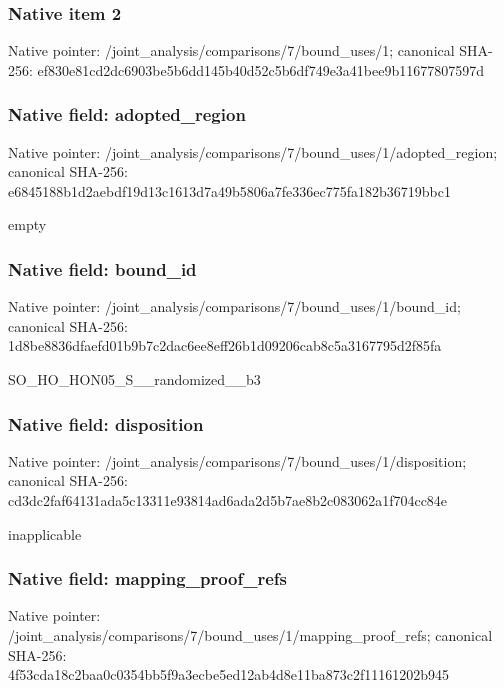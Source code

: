 \documentclass[10pt,a4paper]{article}
\begin{document}
\subsubsection{Native item 2}
Native pointer: /joint\_\allowbreak{}analysis/comparisons/7/bound\_\allowbreak{}uses/1; canonical SHA-256: ef830e81cd2dc6903be5b6dd145b40d52c5b6df749e3a41bee9b11677807597d

\subsubsection{Native field: adopted\_\allowbreak{}region}
Native pointer: /joint\_\allowbreak{}analysis/comparisons/7/bound\_\allowbreak{}uses/1/adopted\_\allowbreak{}region; canonical SHA-256: e6845188b1d2aebdf19d13c1613d7a49b5806a7fe336ec775fa182b36719bbc1

\begingroup\raggedright\sloppy empty\par\endgroup

\subsubsection{Native field: bound\_\allowbreak{}id}
Native pointer: /joint\_\allowbreak{}analysis/comparisons/7/bound\_\allowbreak{}uses/1/bound\_\allowbreak{}id; canonical SHA-256: 1d8be8836dfaefd01b9b7c2dac6ee8eff26b1d09206cab8c5a3167795d2f85fa

\begingroup\raggedright\sloppy SO\_\allowbreak{}HO\_\allowbreak{}HON05\_\allowbreak{}S\_\allowbreak{}\_\allowbreak{}randomized\_\allowbreak{}\_\allowbreak{}b3\par\endgroup

\subsubsection{Native field: disposition}
Native pointer: /joint\_\allowbreak{}analysis/comparisons/7/bound\_\allowbreak{}uses/1/disposition; canonical SHA-256: cd3dc2faf64131ada5c13311e93814ad6ada2d5b7ae8b2c083062a1f704cc84e

\begingroup\raggedright\sloppy inapplicable\par\endgroup

\subsubsection{Native field: mapping\_\allowbreak{}proof\_\allowbreak{}refs}
Native pointer: /joint\_\allowbreak{}analysis/comparisons/7/bound\_\allowbreak{}uses/1/mapping\_\allowbreak{}proof\_\allowbreak{}refs; canonical SHA-256: 4f53cda18c2baa0c0354bb5f9a3ecbe5ed12ab4d8e11ba873c2f11161202b945
\end{document}
